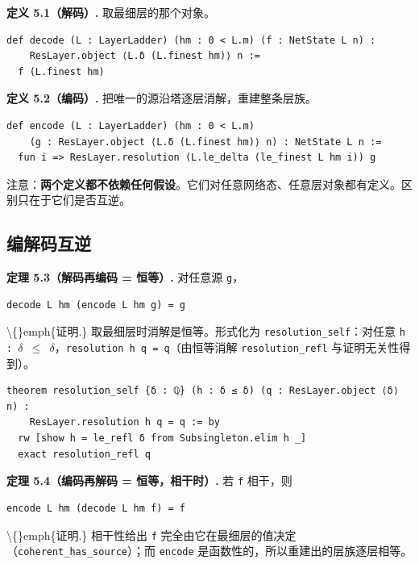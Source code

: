 \documentclass[11pt,a4paper]{ctexart}
\begin{document}
\textbf{定义 5.1（解码）.} 取最细层的那个对象。

\begin{lstlisting}
def decode (L : LayerLadder) (hm : 0 < L.m) (f : NetState L n) :
    ResLayer.object ⟨L.δ (L.finest hm)⟩ n :=
  f (L.finest hm)
\end{lstlisting}

\textbf{定义 5.2（编码）.} 把唯一的源沿塔逐层消解，重建整条层族。

\begin{lstlisting}
def encode (L : LayerLadder) (hm : 0 < L.m)
    (g : ResLayer.object ⟨L.δ (L.finest hm)⟩ n) : NetState L n :=
  fun i => ResLayer.resolution (L.le_delta (le_finest L hm i)) g
\end{lstlisting}

注意：\textbf{两个定义都不依赖任何假设}。它们对任意网络态、任意层对象都有定义。区别只在于它们是否互逆。

\subsection{编解码互逆}

\textbf{定理 5.3（解码再编码 = 恒等）.} 对任意源 \texttt{g}，

\begin{lstlisting}
decode L hm (encode L hm g) = g
\end{lstlisting}

\textbackslash\{\}emph\{证明.\} 取最细层时消解是恒等。形式化为 \texttt{resolution\_self}：对任意 \texttt{h : \ensuremath{\delta} \ensuremath{\le} \ensuremath{\delta}}，\texttt{resolution h q = q}（由恒等消解 \texttt{resolution\_refl} 与证明无关性得到）。

\begin{lstlisting}
theorem resolution_self {δ : ℚ} (h : δ ≤ δ) (q : ResLayer.object ⟨δ⟩ n) :
    ResLayer.resolution h q = q := by
  rw [show h = le_refl δ from Subsingleton.elim h _]
  exact resolution_refl q
\end{lstlisting}

\textbf{定理 5.4（编码再解码 = 恒等，相干时）.} 若 \texttt{f} 相干，则

\begin{lstlisting}
encode L hm (decode L hm f) = f
\end{lstlisting}

\textbackslash\{\}emph\{证明.\} 相干性给出 \texttt{f} 完全由它在最细层的值决定（\texttt{coherent\_has\_source}）；而 \texttt{encode} 是函数性的，所以重建出的层族逐层相等。
\end{document}
